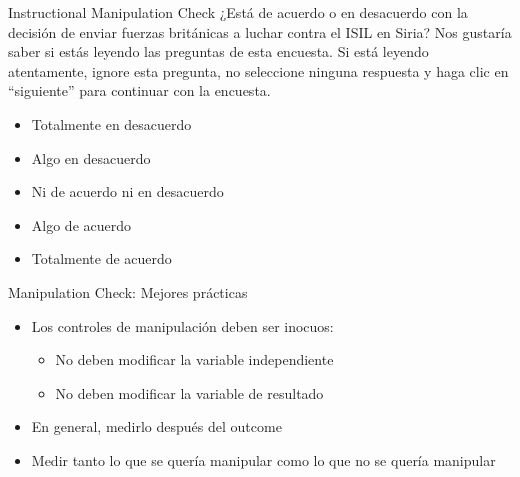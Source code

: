 \documentclass[
  ignorenonframetext,
]{beamer}
\providecommand{\tightlist}{%
  \setlength{\itemsep}{0pt}\setlength{\parskip}{0pt}}
\begin{document}
\begin{frame}{Instructional Manipulation Check}
\protect\hypertarget{instructional-manipulation-check-1}{}
¿Está de acuerdo o en desacuerdo con la decisión de enviar fuerzas
británicas a luchar contra el ISIL en Siria? Nos gustaría saber si estás
leyendo las preguntas de esta encuesta. Si está leyendo atentamente,
ignore esta pregunta, no seleccione ninguna respuesta y haga clic en
``siguiente'' para continuar con la encuesta.

\begin{itemize}
\tightlist
\item
  Totalmente en desacuerdo
\item
  Algo en desacuerdo
\item
  Ni de acuerdo ni en desacuerdo
\item
  Algo de acuerdo
\item
  Totalmente de acuerdo
\end{itemize}
\end{frame}


\begin{frame}{Manipulation Check: Mejores prácticas}
\protect\hypertarget{manipulation-check-mejores-pruxe1cticas}{}
\begin{itemize}
\tightlist
\item
  Los controles de manipulación deben ser inocuos:

  \begin{itemize}
  \tightlist
  \item
    No deben modificar la variable independiente
  \item
    No deben modificar la variable de resultado
  \end{itemize}
\item
  En general, medirlo después del outcome
\item
  Medir tanto lo que se quería manipular como lo que no se quería
  manipular
\end{itemize}
\end{frame}
\end{document}
